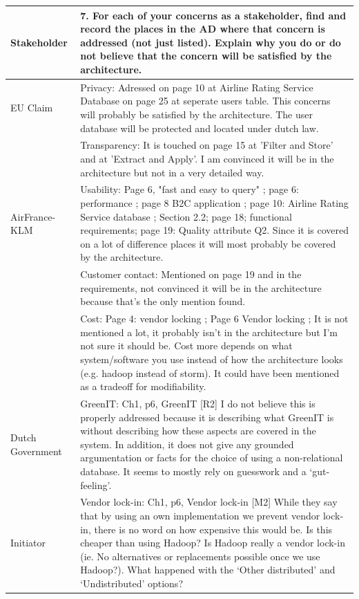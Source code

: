 \documentclass{article}
\begin{document}
\begin{tabularx}{\textwidth}{| l | X |}
  \hline
  \textbf{Stakeholder} & \textbf{7. For each of your concerns as a stakeholder, find and record the places in the AD where that concern is addressed (not just listed). Explain why you do or do not believe that the concern will be satisfied by the architecture.} \\
  \hline
  EU Claim & Privacy: Adressed on page 10 at Airline Rating Service Database on page 25 at seperate users table. This concerns will probably be satisfied by the architecture. The user database will be protected and located under dutch law. \\
    & Transparency: It is touched on page 15 at 'Filter and Store' and at 'Extract and Apply'. I am convinced it will be in the architecture but not in a very detailed way. \\
  \hline
  AirFrance-KLM & Usability: Page 6, "fast and easy to query" ; page 6: performance ; page 8 B2C application ; page 10: Airline Rating Service database ; Section 2.2;  page 18; functional requirements; page 19: Quality attribute Q2. \newline
  Since it is covered on a lot of difference places it will most probably be covered by the architecture. \\
    & Customer contact: Mentioned on page 19 and in the requirements, not convinced it will be in the architecture because that's the only mention found. \\
    & Cost: Page 4: vendor locking ; Page 6 Vendor locking ; It is not mentioned a lot, it probably isn't in the architecture but I'm not sure it should be. Cost more depends on what system/software you use instead of how the architecture looks (e.g. hadoop instead of storm). It could have been mentioned as a tradeoff for modifiability. \\
  \hline
  Dutch Government & GreenIT: Ch1, p6, GreenIT [R2] \newline
  I do not believe this is properly addressed because it is describing what GreenIT is without describing how these aspects are covered in the system. In addition, it does not give any grounded argumentation or facts for the choice of using a non-relational database. It seems to mostly rely on guesswork and a ‘gut-feeling’. \\
  \hline
  Initiator & Vendor lock-in: Ch1, p6, Vendor lock-in [M2] \newline
  While they say that by using an own implementation we prevent vendor lock-in, there is no word on how expensive this would be. Is this cheaper than using Hadoop? Is Hadoop really a vendor lock-in (ie. No alternatives or replacements possible once we use Hadoop?). What happened with the ‘Other distributed’ and ‘Undistributed’ options? \\
  \hline
\end{tabularx}
\end{document}
